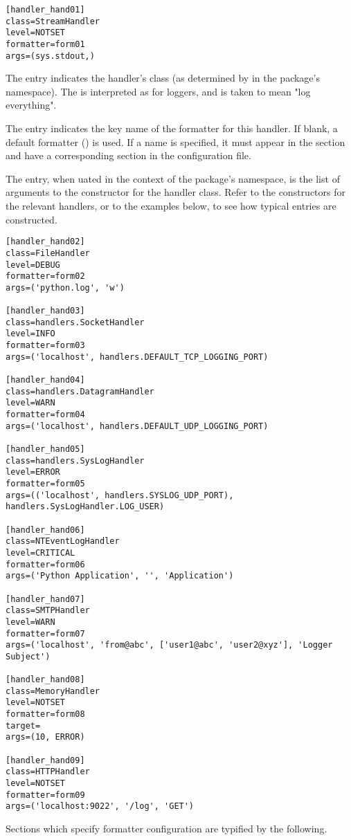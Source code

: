 \begin{verbatim}
[handler_hand01]
class=StreamHandler
level=NOTSET
formatter=form01
args=(sys.stdout,)
\end{verbatim}

The  entry indicates the handler's class (as determined by
 in the  package's namespace). The
 is interpreted as for loggers, and  is taken
to mean "log everything".

The  entry indicates the key name of the formatter for
this handler. If blank, a default formatter
() is used. If a name is specified, it
must appear in the \code{[formatters]} section and have a
corresponding section in the configuration file.

The  entry, when uated in the context of
the  package's namespace, is the list of arguments to
the constructor for the handler class. Refer to the constructors for
the relevant handlers, or to the examples below, to see how typical
entries are constructed.

\begin{verbatim}
[handler_hand02]
class=FileHandler
level=DEBUG
formatter=form02
args=('python.log', 'w')

[handler_hand03]
class=handlers.SocketHandler
level=INFO
formatter=form03
args=('localhost', handlers.DEFAULT_TCP_LOGGING_PORT)

[handler_hand04]
class=handlers.DatagramHandler
level=WARN
formatter=form04
args=('localhost', handlers.DEFAULT_UDP_LOGGING_PORT)

[handler_hand05]
class=handlers.SysLogHandler
level=ERROR
formatter=form05
args=(('localhost', handlers.SYSLOG_UDP_PORT), handlers.SysLogHandler.LOG_USER)

[handler_hand06]
class=NTEventLogHandler
level=CRITICAL
formatter=form06
args=('Python Application', '', 'Application')

[handler_hand07]
class=SMTPHandler
level=WARN
formatter=form07
args=('localhost', 'from@abc', ['user1@abc', 'user2@xyz'], 'Logger Subject')

[handler_hand08]
class=MemoryHandler
level=NOTSET
formatter=form08
target=
args=(10, ERROR)

[handler_hand09]
class=HTTPHandler
level=NOTSET
formatter=form09
args=('localhost:9022', '/log', 'GET')
\end{verbatim}

Sections which specify formatter configuration are typified by the following.

